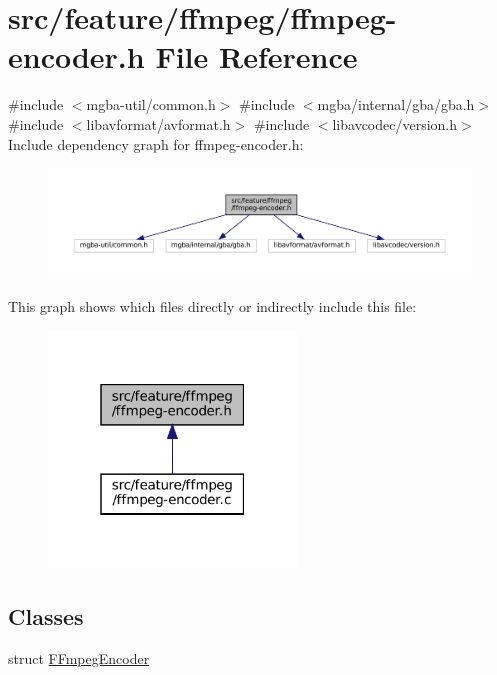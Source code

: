 \hypertarget{ffmpeg-encoder_8h}{}\section{src/feature/ffmpeg/ffmpeg-\/encoder.h File Reference}
\label{ffmpeg-encoder_8h}
{\ttfamily \#include $<$mgba-\/util/common.\+h$>$}\newline
{\ttfamily \#include $<$mgba/internal/gba/gba.\+h$>$}\newline
{\ttfamily \#include $<$libavformat/avformat.\+h$>$}\newline
{\ttfamily \#include $<$libavcodec/version.\+h$>$}\newline
Include dependency graph for ffmpeg-\/encoder.h\+:
\nopagebreak
\begin{figure}[H]
\begin{center}
\leavevmode
\includegraphics[width=350pt]{ffmpeg-encoder_8h__incl}
\end{center}
\end{figure}
This graph shows which files directly or indirectly include this file\+:
\nopagebreak
\begin{figure}[H]
\begin{center}
\leavevmode
\includegraphics[width=187pt]{ffmpeg-encoder_8h__dep__incl}
\end{center}
\end{figure}
\subsection*{Classes}
\begin{DoxyCompactItemize}
\item 
struct \mbox{\hyperlink{ffmpeg-encoder_8h_struct_f_fmpeg_encoder}{F\+Fmpeg\+Encoder}}
\end{DoxyCompactItemize}
